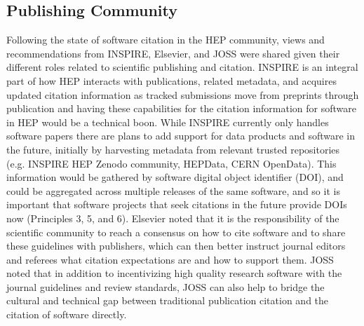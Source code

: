 \subsection{Publishing Community}\label{sec:publishers}

Following the state of software citation in the HEP community, views and recommendations from INSPIRE, Elsevier, and JOSS were shared given their different roles related to scientific publishing and citation.
INSPIRE is an integral part of how HEP interacts with publications, related metadata, and acquires updated citation information as tracked submissions move from preprints through publication and having these capabilities for the citation information for software in HEP would be a technical boon.
While INSPIRE currently only handles software papers there are plans to add support for data products and software in the future, initially by harvesting metadata from relevant trusted repositories (e.g. INSPIRE HEP Zenodo community, HEPData, CERN OpenData).
This information would be gathered by software digital object identifier (DOI), and could be aggregated across multiple releases of the same software, and so it is important that software projects that seek citations in the future provide DOIs now (Principles 3, 5, and 6).
Elsevier noted that it is the responsibility of the scientific community to reach a consensus on how to cite software and to share these guidelines with publishers, which can then better instruct journal editors and referees what citation expectations are and how to support them.
JOSS noted that in addition to incentivizing high quality research software with the journal guidelines and review standards, JOSS can also help to bridge the cultural and technical gap between traditional publication citation and the citation of software directly.
